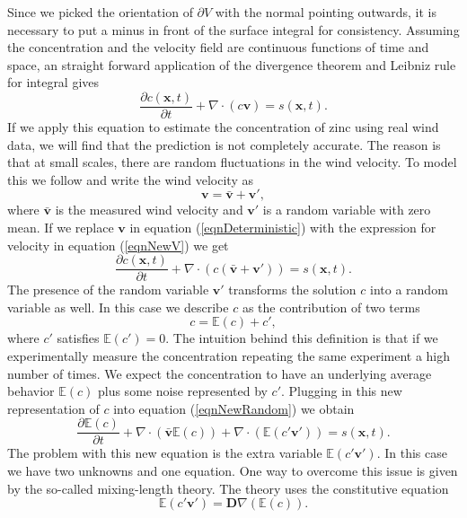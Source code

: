 \documentclass[12pt]{book}
\newcommand{\E}{\mathbb{E}} %
\newcommand{\x}{\textbf{x}}
\newcommand{\vv}{\textbf{v}}
\newcommand{\dv}{\nabla\cdot}
\begin{document}
Since we picked the orientation of $\partial V$ with the normal pointing outwards, it is
necessary to put a minus in front of the surface integral for consistency. Assuming
the concentration and the velocity field are continuous functions of time and space, an 
straight forward application of the divergence theorem and Leibniz rule for integral gives
\begin{equation}\label{eqnDeterministic}
\frac{\partial c(\x,t)}{\partial t}+\nabla\cdot(c\textbf{v})=s(\x,t).
\end{equation}
If we apply this equation to estimate the concentration of zinc using real wind data, we 
will find that the prediction is not completely accurate. The reason is that at small scales, there
are random fluctuations in the wind velocity. To model this we follow \cite{seinfeld1998atmospheric}
and write the wind velocity as
\begin{equation}\label{eqnNewV}
\vv=\bar{\vv}+\vv',
\end{equation}
where $\bar{\vv}$ is the measured wind velocity and $\vv'$ is a random variable with zero mean.
If we replace $\vv$ in equation (\ref{eqnDeterministic}) with the expression for velocity
in equation (\ref{eqnNewV}) we get
\begin{equation}\label{eqnNewRandom}
\frac{\partial c(\x,t)}{\partial t}+\nabla\cdot(c(\bar{\textbf{v}}+\vv'))=s(\x,t).
\end{equation}
The presence of the random variable $\vv'$ transforms the solution $c$ into a random 
variable as well. In this case we describe $c$ as the contribution of two terms
\begin{equation*}
c=\E(c)+c',
\end{equation*}
where $c'$ satisfies $\E(c')=0$. The intuition behind this definition is that if we experimentally
measure the concentration repeating the same experiment a high number of times. We expect the 
concentration to have an underlying average behavior $\E(c)$ plus some  noise represented by $c'$.
Plugging in this new representation of $c$ into equation (\ref{eqnNewRandom}) we obtain
\begin{equation}\label{eqnInconsistent}
\frac{\partial\E(c)}{\partial t}+\dv(\bar{\vv}\E(c))+\dv(\E(c'\vv'))=s(\x,t).
\end{equation}
The problem with this new equation is  the extra variable $\E(c'\vv')$.
In this case we have two unknowns and one equation. 
One way to overcome this issue is given by the so-called mixing-length theory. The
theory uses the constitutive equation
\begin{equation*}
\E(c'\vv')=\textbf{D}\nabla(\E(c)).
\end{equation*}
\end{document}
